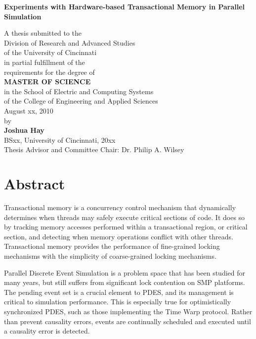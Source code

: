 \documentclass[11pt]{book}
\begin{document}
\thispagestyle{empty}

\doublespacing

\vspace*{0.5in}

\begin{center}
\LARGE{\textbf{Experiments with Hardware-based Transactional Memory in Parallel Simulation}}

\vspace*{0.4in}

  {\large A thesis submitted to the\\[0.20in]
    Division of Research and Advanced Studies\\
    of the University of Cincinnati\\[0.20in]
    in partial fulfillment of the\\
    requirements for the degree of\\[0.20in]
    {\bf MASTER OF SCIENCE}\\[0.20in]
    in the School of Electric and Computing Systems\\
    of the College of Engineering and Applied Sciences\\[0.20in]
    August xx, 2010\\[0.20in]
    by\\[0.20in]
    {\bf Joshua Hay}\\
    BSxx, University of Cincinnati, 20xx\\}
  \vspace{0.5in}
  {\large Thesis Advisor and Committee Chair:  Dr. Philip A. Wilsey}
\end{center}

\clearpage

\setcounter{page}{1}
\clearpage

\chapter*{Abstract} 

Transactional memory is a concurrency control mechanism that dynamically determines when
threads may safely execute critical sections of code.  It does so by tracking memory
accesses performed within a transactional region, or critical section, and detecting when
memory operations conflict with other threads.  Transactional memory provides the
performance of fine-grained locking mechanisms with the simplicity of coarse-grained
locking mechanisms.

Parallel Discrete Event Simulation is a problem space that has been studied for many
years, but still suffers from significant lock contention on SMP platforms.  The pending
event set is a crucial element to PDES, and its management is critical to simulation
performance.  This is especially true for optimistically synchronized PDES, such as those
implementing the Time Warp protocol.  Rather than prevent causality errors, events are
continually scheduled and executed until a causality error is detected.
\end{document}
